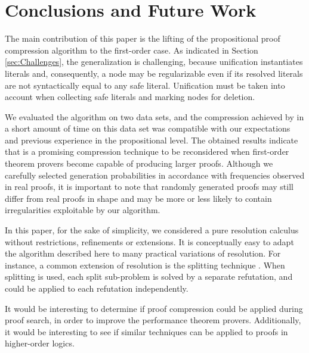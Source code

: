 \vspace{-0.25cm}
\section{Conclusions and Future Work}\label{sec:conclusion}

The main contribution of this paper is the lifting of the propositional proof compression algorithm {\RPI} to the first-order case. As indicated in Section \ref{sec:Challenges}, the generalization is challenging, because unification instantiates literals and, consequently, a node may be regularizable even if its resolved literals are not syntactically equal to any safe literal. Unification must be taken into account when collecting safe literals and marking nodes for deletion.



We evaluated the algorithm on two data sets, and
the compression achieved by {\FORPI} in a short amount of time on this data set was compatible with our expectations and previous experience in the propositional level. 
The obtained results indicate that {\FORPI} is a promising compression technique to be reconsidered when first-order theorem provers become capable of producing larger proofs. Although we carefully selected generation probabilities in accordance with frequencies observed in real proofs, it is important to note that randomly generated proofs may still differ from real proofs in shape and may be more or less likely to contain irregularities exploitable by our algorithm. 


In this paper, for the sake of simplicity, we considered a pure resolution calculus without restrictions, refinements or extensions. 
It is conceptually easy to adapt the algorithm described here to many practical variations of resolution. 
For instance, a common extension of resolution is the splitting technique \cite{WeidenbachSplitting}. When splitting is used, each split sub-problem is solved by a separate refutation, and {\FORPI} could be applied to each refutation independently. 

It would be interesting to determine if proof compression could be applied during proof search, in order to improve the performance theorem provers. Additionally, it would be interesting to see if similar techniques can be applied to proofs in higher-order logics.




